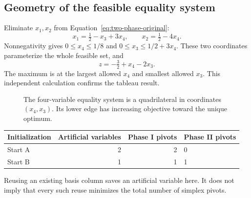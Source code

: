 \documentclass[11pt,a4paper]{article}
\begin{document}
\subsection{Geometry of the feasible equality system}
Eliminate $x_1,x_2$ from Equation~\eqref{eq:two-phase-original}:
\[
  x_1=\tfrac12-x_3+3x_4,\qquad x_2=\tfrac12-4x_4.
\]
Nonnegativity gives
$0\leq x_4\leq1/8$ and $0\leq x_3\leq1/2+3x_4$.
These two coordinates parameterize the whole feasible set, and
\[
  z=-\tfrac32+x_4-2x_3.
\]
The maximum is at the largest allowed $x_4$ and smallest allowed $x_3$.
This independent calculation confirms the tableau result.
\begin{figure}[H]
  \centering
  \caption{The four-variable equality system is a quadrilateral in coordinates
    $(x_4,x_3)$. Its lower edge has increasing objective toward the unique optimum.}
  \label{fig:two-phase-geometry}
\end{figure}
\begin{center}
  \begin{tabular}{lrrl}\toprule
    Initialization & Artificial variables & Phase I pivots & Phase II pivots\\\midrule
    Start A & 2 & 2 & 0\\
    Start B & 1 & 1 & 1\\\bottomrule
  \end{tabular}
\end{center}
Reusing an existing basis column saves an artificial variable here. It does not
imply that every such reuse minimizes the total number of simplex pivots.
\end{document}

